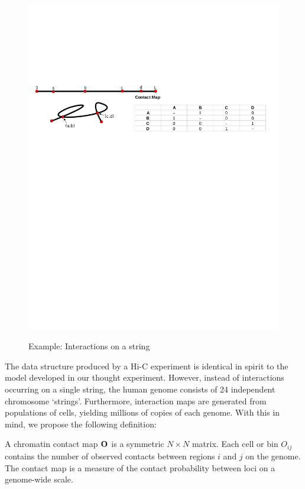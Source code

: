 \begin{figure}[t]
  \centering
  \caption{Example: Interactions on a string}
  \includegraphics[width=\textwidth]{figures/mathematics/strmtx}\label{fig:string}
\end{figure}

The data structure produced by a Hi-C experiment is identical in spirit to the model developed in our thought experiment.  However, instead of
interactions occurring on a single string, the human genome consists of 24 independent chromosome `strings'.  Furthermore, interaction maps are
generated from populations of cells, yielding millions of copies of each genome.  With this in mind, we propose the following definition:

\begin{defn}
  A chromatin contact map $\mathbf{O}$ is a symmetric $N \times N$ matrix.  Each cell or bin $O_{ij}$ contains the number of observed contacts
  between regions $i$ and $j$ on the genome.  The contact map is a measure of the contact probability between loci on a genome-wide scale.
\end{defn}

